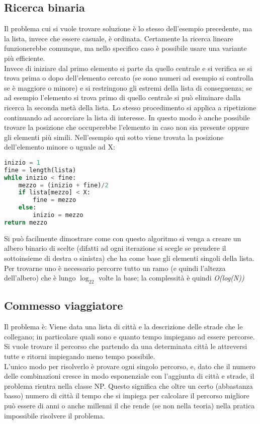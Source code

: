 \subsection{Ricerca binaria}
Il problema cui si vuole trovare soluzione è lo stesso dell'esempio precedente, ma la lista, invece che essere casuale, è ordinata. Certamente la ricerca lineare funzionerebbe comunque, ma nello specifico caso è possibile usare una variante più efficiente.\\
Invece di iniziare dal primo elemento si parte da quello centrale e si verifica se si trova prima o dopo dell'elemento cercato (se sono numeri ad esempio si controlla se è maggiore o minore) e si restringono gli estremi della lista di conseguenza; se ad esempio l'elemento si trova primo di quello centrale si può eliminare dalla ricerca la seconda metà della lista. Lo stesso procedimento si applica a ripetizione continuando ad accorciare la lista di interesse. In questo modo è anche possibile trovare la posizione che occuperebbe l'elemento in caso non sia presente oppure gli elementi più simili. Nell'esempio qui sotto viene trovata la posizione dell'elemento minore o uguale ad X:
\begin{lstlisting}[language=python]
inizio = 1
fine = length(lista)
while inizio < fine:
	mezzo = (inizio + fine)/2
	if lista[mezzo] < X:
		fine = mezzo
	else:
		inizio = mezzo
return mezzo
\end{lstlisting}
Si può facilmente dimostrare come con questo algoritmo si venga a creare un albero binario di scelte (difatti ad ogni iterazione si scegle se prendere il sottoinsieme di destra o sinistra) che ha come base gli elementi singoli della lista. Per trovarne uno è necessario percorre tutto un ramo (e quindi l'altezza dell'albero) che è lungo \textit{$\log_22$} volte la base; la complessità è quindi \textit{O(log(N))}
\subsection{Commesso viaggiatore}
Il problema è: Viene data una lista di città e la descrizione delle strade che le collegano; in particolare quali sono e quanto tempo impiegano ad essere percorse. Si vuole trovare il percorso che partendo da una determinata città le attreversi tutte e ritorni impiegando meno tempo possibile.\\
L'unico modo per risolverlo è provare ogni singolo percorso, e, dato che il numero delle combinazioni cresce in modo esponenziale con l'aggiunta di città e strade, il problema rientra nella classe NP. Questo significa che oltre un certo (abbastanza basso) numero di città il tempo che si impiega per calcolare il percorso migliore può essere di anni o anche millenni il che rende (se non nella teoria) nella pratica impossibile risolvere il problema.
